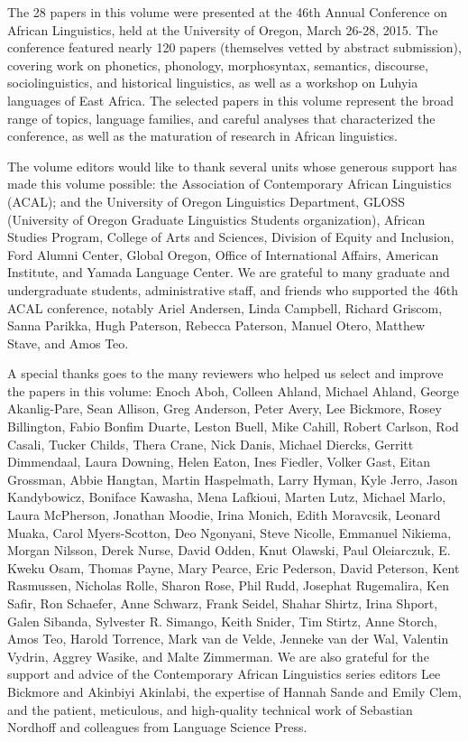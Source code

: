 \largerpage
The 28 papers in this volume were presented at the 46th Annual Conference on African Linguistics, held at the University of Oregon, March 26-28, 2015. The conference featured nearly 120 papers (themselves vetted by abstract submission), covering work on phonetics, phonology, morphosyntax, semantics, discourse, sociolinguistics, and historical linguistics, as well as a workshop on Luhyia languages of East Africa. The selected papers in this volume represent the broad range of topics, language families, and careful analyses that characterized the conference, as well as the maturation of research in African linguistics. 

The volume editors would like to thank several units whose generous support has made this volume possible: the Association of Contemporary African Linguistics (ACAL); 
and the University of Oregon Linguistics Department, 
 GLOSS (University of Oregon Graduate Linguistics Students organization), 
 African Studies Program, 
 College of Arts and Sciences, 
 Division of Equity and Inclusion, 
 Ford Alumni Center, 
 Global Oregon, 
 Office of International Affairs,
 American  Institute, 
 and Yamada Language Center.
We are grateful to many graduate and undergraduate students, administrative staff, and friends who supported the 46th ACAL conference, notably 
  Ariel Andersen, 
  Linda Campbell, 
  Richard Griscom, 
  Sanna Parikka, 
  Hugh Paterson, 
  Rebecca Paterson, 
  Manuel Otero, 
  Matthew Stave, 
  and Amos Teo.

A special thanks goes to the many reviewers who helped us select and improve the papers in this volume: 
Enoch Aboh,
Colleen Ahland,
Michael Ahland,
George Akanlig-Pare,
Sean Allison,
Greg Anderson,
Peter Avery,
Lee Bickmore,
Rosey Billington,
Fabio Bonfim Duarte,
Leston Buell,
Mike Cahill,
Robert Carlson,
Rod Casali,
Tucker Childs,
Thera Crane,
Nick Danis,
Michael Diercks,
Gerritt Dimmendaal,
Laura Downing,
Helen Eaton,
Ines Fiedler,
Volker Gast,
Eitan Grossman,
Abbie Hangtan,
Martin Haspelmath,
Larry Hyman,
Kyle Jerro,
Jason Kandybowicz,
Boniface Kawasha,
Mena Lafkioui,
Marten Lutz,
Michael Marlo,
Laura McPherson,
Jonathan Moodie,
Irina Monich,
Edith Moravcsik,
Leonard Muaka,
Carol Myers-Scotton,
Deo Ngonyani,
Steve Nicolle,
Emmanuel Nikiema,
Morgan Nilsson,
Derek Nurse,
David Odden,
Knut Olawski,
Paul Oleiarczuk,
E. Kweku Osam,
Thomas Payne,
Mary Pearce,
Eric Pederson,
David Peterson,
Kent Rasmussen,
Nicholas Rolle,
Sharon Rose,
Phil Rudd,
Josephat Rugemalira,
Ken Safir,
Ron Schaefer,
Anne Schwarz,
Frank Seidel,
Shahar Shirtz,
Irina Shport,
Galen Sibanda,
Sylvester R. Simango,
Keith Snider,
Tim Stirtz,
Anne Storch,
Amos Teo,
Harold Torrence,
Mark van de Velde,
Jenneke van der Wal,
Valentin Vydrin,
Aggrey Wasike,
and Malte Zimmerman.
 We are also grateful for the support and advice of the Contemporary African Linguistics series editors Lee Bickmore and Akinbiyi Akinlabi, the expertise of Hannah Sande and Emily Clem, and the patient, meticulous, and high-quality technical work of Sebastian Nordhoff and colleagues from Language Science Press. 